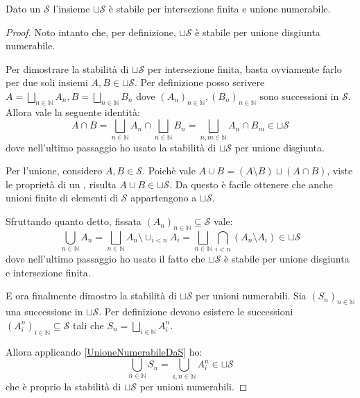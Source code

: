 \begin{proposition}\label{UnioneDisgiuntaQuasiAlgebra}
	Dato un \semiring{} $\mathcal S$ l'insieme $\sqcup\mathcal S$ è stabile per intersezione finita e unione numerabile.
\end{proposition}
\begin{proof}
	Noto intanto che, per definizione, $\sqcup\mathcal S$ è stabile per unione disgiunta numerabile.
	
	Per dimostrare la stabilità di $\sqcup\mathcal S$ per intersezione finita, basta ovviamente farlo per due soli insiemi $A,B\in\sqcup\mathcal S$. Per definizione posso scrivere $A=\bigsqcup_{n\in\mathbb N} A_n, B=\bigsqcup_{n\in\mathbb N} B_n$ dove $(A_n)_{n\in\mathbb N},(B_n)_{n\in\mathbb N}$ sono successioni in $\mathcal S$. Allora vale la seguente identità:
	\begin{equation*}
		A\cap B=\bigsqcup_{n\in\mathbb N} A_n\cap\bigsqcup_{n\in\mathbb N} B_n=
		\bigsqcup_{n,m\in\mathbb N} A_n\cap B_m\in\sqcup\mathcal S
	\end{equation*}
	dove nell'ultimo passaggio ho usato la stabilità di $\sqcup\mathcal S$ per unione disgiunta.
	
	Per l'unione, considero $A,B\in\mathcal S$. Poichè vale $A\cup B=(A\setminus B)\sqcup(A\cap B)$, viste le proprietà di un \semiring{}, risulta $A\cup B\in \sqcup\mathcal S$. Da questo è facile ottenere che anche unioni finite di elementi di $\mathcal S$ appartengono a $\sqcup\mathcal S$.
	
	Sfruttando quanto detto, fissata $(A_n)_{n\in\mathbb N}\subseteq\mathcal S$ vale:
	\begin{equation}\label{UnioneNumerabileDaS}
		\bigcup_{n\in\mathbb N} A_n=\bigsqcup_{n\in\mathbb N} A_n\setminus\cup_{i<n} A_i
		=\bigsqcup_{n\in\mathbb N} \bigcap_{i<n} (A_n\setminus A_i)\in\sqcup\mathcal S
	\end{equation}
	dove nell'ultimo passaggio ho usato il fatto che $\sqcup\mathcal S$ è stabile per unione disgiunta e intersezione finita.
	
	E ora finalmente dimostro la stabilità di $\sqcup\mathcal S$ per unioni numerabili. Sia $(S_n)_{n\in\mathbb N}$ una successione in $\sqcup\mathcal S$. Per definizione devono esistere le successioni $(A^n_i)_{i\in\mathbb N}\subseteq \mathcal S$ tali che $S_n=\bigsqcup_{i\in\mathbb N} A^n_i$.
	
	Allora applicando \cref{UnioneNumerabileDaS} ho:
	\begin{equation*}
		\bigcup_{n\in\mathbb N}S_n=\bigcup_{i,n\in\mathbb N}A^n_i\in\sqcup\mathcal S 
	\end{equation*}
	che è proprio la stabilità di $\sqcup\mathcal S$ per unioni numerabili.
\end{proof}

